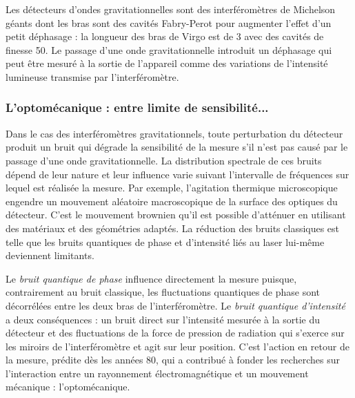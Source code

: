 \documentclass[12pt,a4paper]{article}
\begin{document}
Les détecteurs d'ondes gravitationnelles sont des interféromètres de Michelson géants dont les bras sont des cavités Fabry-Perot pour augmenter l'effet d'un petit déphasage : la longueur des bras de Virgo est de \unit{3}{\kilo\meter} avec des cavités de finesse 50.
Le passage d'une onde gravitationnelle introduit un déphasage qui peut être mesuré à la sortie de l'appareil comme des variations de l'intensité lumineuse transmise par l'interféromètre.

\subsubsection{L'optomécanique : entre limite de sensibilité...}

Dans le cas des interféromètres gravitationnels, toute perturbation du détecteur produit un bruit qui dégrade la sensibilité de la mesure s'il n'est pas causé par le passage d'une onde gravitationnelle.
La distribution spectrale de ces bruits dépend de leur nature et leur influence varie suivant l'intervalle de fréquences sur lequel est réalisée la mesure.
Par exemple, l'agitation thermique microscopique engendre un mouvement aléatoire macroscopique de la surface des optiques du détecteur.
C'est le mouvement brownien qu'il est possible d'atténuer en utilisant des matériaux et des géométries adaptés.
La réduction des bruits classiques est telle que les bruits quantiques de phase et d'intensité liés au laser lui-même deviennent limitants.

Le \textit{bruit quantique de phase} influence directement la mesure puisque, contrairement au bruit classique, les fluctuations quantiques de phase sont décorrélées entre les deux bras de l'interféromètre.
Le \textit{bruit quantique d'intensité} a deux conséquences : un bruit direct sur l'intensité mesurée à la sortie du détecteur et des fluctuations de la force de pression de radiation qui s'exerce sur les miroirs de l'interféromètre et agit sur leur position.
C'est l'action en retour de la mesure, prédite dès les années 80, qui a contribué à fonder les recherches sur l'interaction entre un rayonnement électromagnétique et un mouvement mécanique : l'optomécanique.
\end{document}
